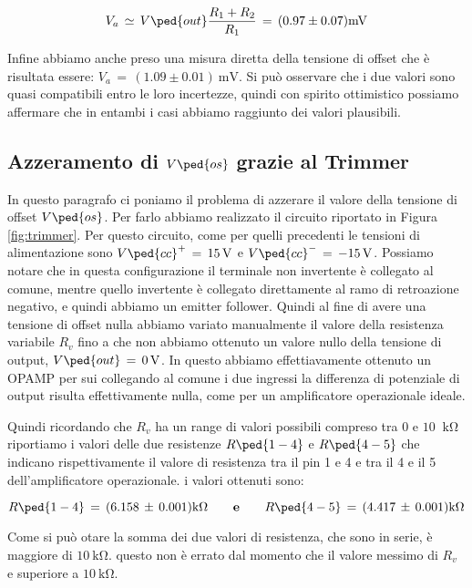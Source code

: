 \begin{equation}
	V_a\,\simeq\,V\ped{out}\frac{R_1+R_2}{R_1}\,=\, (0.97 \pm 0.07)\SI{}{\milli\volt}
\end{equation}

Infine abbiamo anche preso una misura diretta della tensione di offset che è risultata essere: $V_a\,=\,(1.09\pm0.01)\SI{}{\milli\volt}$. Si può osservare che i due valori sono quasi compatibili entro le loro incertezze, quindi con spirito ottimistico possiamo affermare che in entambi i casi abbiamo raggiunto dei valori plausibili.

\subsection*{Azzeramento di $V\ped{os}$ grazie al Trimmer}

In questo paragrafo ci poniamo il problema di azzerare il valore della tensione di offset $V\ped{os}$. Per farlo abbiamo realizzato il circuito riportato in Figura \ref{fig:trimmer}.
Per questo circuito, come per quelli precedenti le tensioni di alimentazione sono $V\ped{cc}^+\,=\,\SI{+15}{\volt}$ e $V\ped{cc}^-\,=\,\SI{-15}{\volt}$.
Possiamo notare che in questa configurazione il terminale non invertente è collegato al comune, mentre quello invertente è collegato direttamente al ramo di retroazione negativo, e quindi abbiamo un emitter follower.
Quindi al fine di avere una tensione di offset nulla abbiamo variato manualmente il valore della resistenza variabile $R_v$ fino a che non abbiamo ottenuto un valore nullo della tensione di output, $V\ped{out}\,=\,\SI{0}{\volt}$. In questo abbiamo effettiavamente ottenuto un OPAMP per sui collegando al comune i due ingressi la differenza di potenziale di output risulta effettivamente nulla, come per un amplificatore operazionale ideale.

Quindi ricordando che $R_v$ ha un range di valori possibili compreso tra $0$ e $10$ $\SI{}{\kilo\ohm}$ riportiamo i valori delle due resistenze $R\ped{1-4}$ e $R\ped{4-5}$ che indicano rispettivamente il valore di resistenza tra il pin 1 e 4  e tra il 4 e il 5 dell'amplificatore operazionale. i valori ottenuti sono:

\begin{equation}
	R\ped{1-4}\,=\,(6.158\,\pm\,0.001)\SI{}{\kilo\ohm} \qquad \textbf{e} \qquad R\ped{4-5}\,=\,(4.417\,\pm\,0.001)\SI{}{\kilo\ohm}
\end{equation}

Come si può otare la somma dei due valori di resistenza, che sono in serie, è maggiore di $\SI{10}{\kilo\ohm}$. questo non è errato dal momento che il valore messimo di $R_v$ e superiore a $\SI{10}{\kilo\ohm}$.

